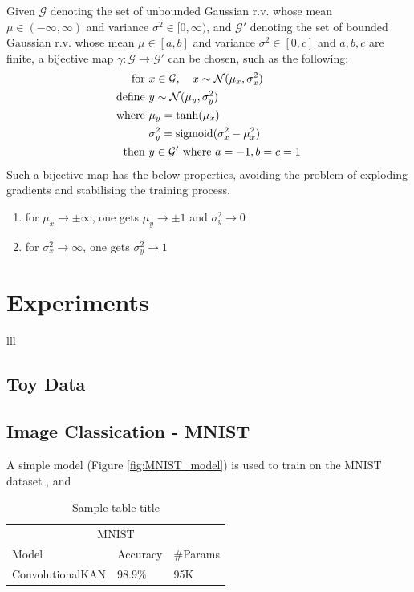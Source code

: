 \documentclass{article}
\begin{document}
Given $\mathcal{G}$ denoting the set of unbounded Gaussian r.v. whose mean $\mu\in(-\infty,\infty) $ and variance $\sigma^2\in[0,\infty)$, and $\mathcal{G}'$ denoting the set of bounded Gaussian r.v. whose mean $\mu\in[a,b]$ and variance $\sigma^2\in[0,c]$ and $a,b,c$ are finite, a bijective map $\gamma: \mathcal{G} \rightarrow \mathcal{G}'$ can be chosen, such as the following:
\begin{equation}
    \begin{aligned}
        \text{for }&x\in\mathcal{G},\quad x\sim\mathcal{N}(\mu_x,\sigma_x^2) \\
        \text{define }&y\sim\mathcal{N}(\mu_y, \sigma_y^2) \\
        \text{where }&\mu_y = \text{tanh}(\mu_x) \\
                     &\sigma_y^2 = \text{sigmoid}(\sigma_x^2 - \mu_x^2) \\
        \text{then }&y\in\mathcal{G}' \text{ where }a=-1,\space b=c=1
    \end{aligned}
    \label{eq:normalizeMap}
\end{equation}
Such a bijective map has the below properties, avoiding the problem of exploding gradients and stabilising the training process.
\begin{enumerate}
    \item for $\mu_x\rightarrow\pm\infty$, one gets $\mu_y\rightarrow\pm 1$ and $\sigma_y^2\rightarrow 0$
    \item for $\sigma_x^2\rightarrow\infty$, one gets $\sigma_y^2\rightarrow 1$
\end{enumerate}

\section{Experiments}
lll
\subsection{Toy Data}


\subsection{Image Classication - MNIST}
A simple model (Figure \ref{fig:MNIST_model}) is used to train on the MNIST dataset \cite{MNIST}, and

\begin{table}
    \caption{Sample table title}
     \centering
     \begin{tabular}{lll}
       \toprule
       \multicolumn{3}{c}{MNIST}                                 \\
       \cmidrule(r){1-3}
       Model     & Accuracy & \#Params     \\
       \midrule
       ConvolutionalKAN\cite{ConvolutionalKAN} & 98.9\% & 95K  \\
       \bottomrule
     \end{tabular}
     \label{tab:table}
\end{table}
\end{document}
